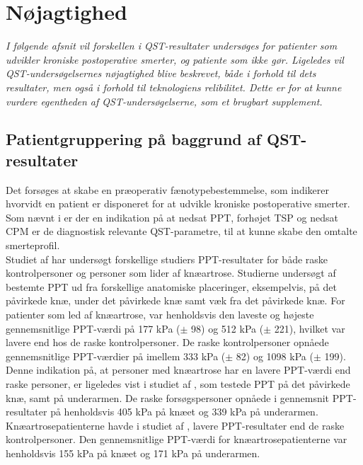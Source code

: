 \section{Nøjagtighed}
\textit{I følgende afsnit vil forskellen i QST-resultater undersøges for patienter som udvikler kroniske postoperative smerter, og patiente som ikke gør. Ligeledes vil QST-undersøgelsernes nøjagtighed blive beskrevet, både i forhold til dets resultater, men også i forhold til teknologiens relibilitet. Dette er for at kunne vurdere egentheden af QST-undersøgelserne, som et brugbart supplement.}

\subsection{Patientgruppering på baggrund af QST-resultater}
Det forsøges at skabe en præoperativ fænotypebestemmelse, som indikerer hvorvidt en patient er disponeret for at udvikle kroniske postoperative smerter. Som nævnt i  er der en indikation på at nedsat PPT, forhøjet TSP og nedsat CPM er de diagnostisk relevante QST-parametre, til at kunne skabe den omtalte smerteprofil. \\
Studiet af  har undersøgt forskellige studiers PPT-resultater for både raske kontrolpersoner og personer som lider af knæartrose. Studierne undersøgt af  bestemte PPT ud fra forskellige anatomiske placeringer, eksempelvis, på det påvirkede knæ, under det påvirkede knæ samt væk fra det påvirkede knæ. For patienter som led af knæartrose, var henholdsvis den laveste og højeste gennemsnitlige PPT-værdi på 177 kPa ($\pm$ 98) og 512 kPa ($\pm$ 221), hvilket var lavere end hos de raske kontrolpersoner. De raske kontrolpersoner opnåede gennemsnitlige PPT-værdier på imellem 333 kPa ($\pm$ 82) og 1098 kPa ($\pm$ 199). \citep{Suokas2012} Denne indikation på, at personer med knæartrose har en lavere PPT-værdi end raske personer, er ligeledes vist i studiet af , som testede PPT på det påvirkede knæ, samt på underarmen. De raske forsøgspersoner opnåede i gennemsnit PPT-resultater på henholdsvis 405 kPa på knæet og 339 kPa på underarmen. Knæartrosepatienterne havde i studiet af , lavere PPT-resultater end de raske kontrolpersoner. Den gennemsnitlige PPT-værdi for knæartrosepatienterne var henholdsvis 155 kPa på knæet og 171 kPa på underarmen. \citep{Wylde2013} 

